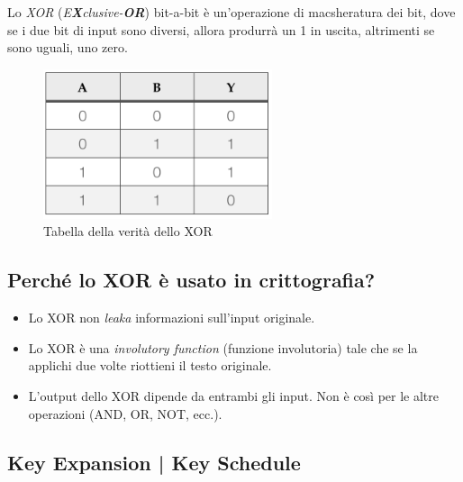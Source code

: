 \textsf{\small Lo \emph{XOR} (\emph{E\textbf{X}clusive-\textbf{OR}}) bit-a-bit è un'operazione di macsheratura dei bit, dove se i due bit di input sono diversi, allora produrrà un 1 in uscita, altrimenti se sono uguali, uno zero.} 

\begin{figure}[H]
	\centering
	\includegraphics[width=0.6\textwidth, height=0.6\textheight, keepaspectratio]{./images/XOR/XOR-Truth-Table.png}
	\caption{Tabella della verità dello XOR}
	\label{fig:xor_truth_table}
\end{figure}

\subsection{Perché lo XOR è usato in crittografia?}

   

\begin{itemize}
	\item \textsf{\small Lo XOR non \emph{leaka} informazioni sull'input originale.} %
	\item \textsf{\small Lo XOR è una \emph{involutory function} (funzione involutoria) tale che se la applichi due volte riottieni il testo originale.}
	\item \textsf{\small L'output dello XOR dipende da entrambi gli input. Non è così per le altre operazioni (AND, OR, NOT, ecc.).}
\end{itemize}

\fleuron


\subsection{Key Expansion | Key Schedule} %

   


